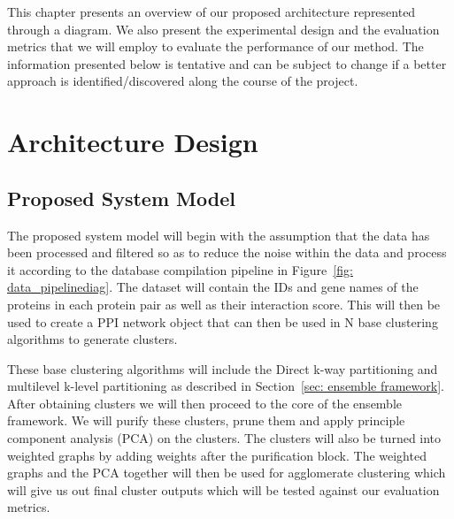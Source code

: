 This chapter presents an overview of our proposed architecture represented through a diagram. We also present the experimental design and the evaluation metrics that we will employ to evaluate the performance of our method. The information presented below is tentative and can be subject to change if a better approach is identified/discovered along the course of the project.

\section{Architecture Design}
\subsection{Proposed System Model}
The proposed system model will begin with the assumption that the data has been 
processed and filtered so as to reduce the noise within the data and process it 
according to the database compilation pipeline in Figure~\ref{fig: data_pipelinediag}. The dataset will contain the IDs and gene names of the proteins 
in each protein pair as well as their interaction score. This will then be used to 
create a PPI network object that can then be used in N base clustering algorithms to 
generate clusters. 

These base clustering algorithms will include the Direct k-way 
partitioning and multilevel k-level partitioning as described in Section~\ref{sec: 
ensemble framework}. After obtaining clusters we will then proceed to the core of the
ensemble framework. We will purify these clusters, prune them and apply principle component analysis (PCA) on the clusters. The clusters will also be turned into weighted graphs by adding weights after the purification block. The weighted graphs and the PCA together will then be used for agglomerate clustering which will give us out final cluster outputs which will be tested against our evaluation metrics.

